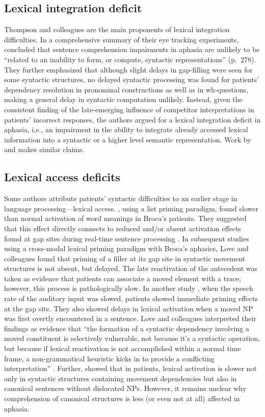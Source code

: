 \documentclass{cambridge7A}\usepackage[]{graphicx}\usepackage[]{color}
\begin{document}
\subsection{Lexical integration deficit}
Thompson and colleagues are the main proponents of lexical integration difficulties.
In a comprehensive summary of their eye tracking experiments, \cite{ThompsonChoy-2009} concluded that sentence comprehension impairments in aphasia are unlikely to be ``related to an inability to form, or compute, syntactic representations'' (p.\ 278). They further emphasized that although slight delays in gap-filling were seen for some syntactic structures, no delayed syntactic processing was found for patients' dependency resolution in pronominal constructions as well as in wh-questions, making a general delay in syntactic computation unlikely. Instead, given the consistent finding of the late-emerging influence of competitor interpretations in patients' incorrect responses, the authors  argued for a lexical integration deficit in aphasia, i.e., an impairment in the ability to integrate already accessed lexical information into a syntactic or a higher level semantic representation. Work by \cite{hagoort1996lexical} and \cite{SwaabEtAl-1997} makes similar claims.

\subsection{Lexical access deficits}
Some authors attribute patients' syntactic difficulties to an earlier stage in language processing---lexical access.
\cite{Prather:1997}, using a list priming paradigm, found slower than normal activation of word meanings in Broca's patients. They suggested that this effect directly connects to reduced and/or absent activation effects found at gap sites during real-time sentence processing \citep{Zurif1994}. 
In subsequent studies using a cross-modal lexical priming paradigm with Broca's aphasics, Love and colleagues \citep{Swinney1996,Love2001} found that priming of a filler at its gap site in syntactic movement structures is not absent, but delayed. The late reactivation of the antecedent was taken as evidence that patients can associate a moved element with a trace; however, this process is pathologically slow.
In another study \citep{Love:2008}, when the speech rate of the auditory input was slowed, patients showed immediate priming effects at the gap site. They also showed delays in lexical activation when a moved NP was first overtly encountered in a sentence. Love and colleagues interpreted their findings as evidence that ``the formation of a syntactic dependency involving a moved constituent is selectively vulnerable, not because it's a syntactic operation, but because if lexical reactivation is not accomplished within a normal time frame, a non-grammatical heuristic kicks in to provide a conflicting interpretation'' \citep[p.~216][]{Love:2008}. Further, \cite{Ferrill2012} showed that in patients, lexical activation is slower not only in syntactic structures containing movement dependencies but also in canonical sentences without dislocated NPs. However, it remains unclear why comprehension of canonical structures is less (or even not at all) affected in aphasia.
\end{document}
